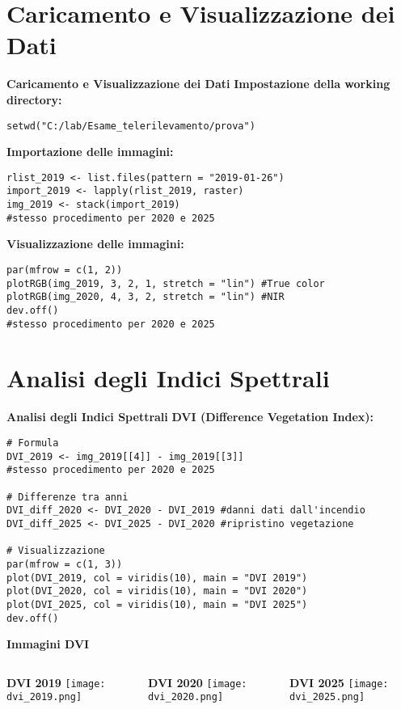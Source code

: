 \documentclass{beamer}
\begin{document}
\section{Caricamento e Visualizzazione dei Dati}

\begin{frame}[fragile]{\textbf{Caricamento e Visualizzazione dei Dati}}
\textbf{Impostazione della working directory:}
\begin{lstlisting}
setwd("C:/lab/Esame_telerilevamento/prova")
\end{lstlisting}

\textbf{Importazione delle immagini:}
\begin{lstlisting}
rlist_2019 <- list.files(pattern = "2019-01-26")
import_2019 <- lapply(rlist_2019, raster)
img_2019 <- stack(import_2019)
#stesso procedimento per 2020 e 2025
\end{lstlisting}

\textbf{Visualizzazione delle immagini:}
\begin{lstlisting}
par(mfrow = c(1, 2))
plotRGB(img_2019, 3, 2, 1, stretch = "lin") #True color
plotRGB(img_2020, 4, 3, 2, stretch = "lin") #NIR
dev.off()
#stesso procedimento per 2020 e 2025
\end{lstlisting}
\end{frame}

\section{Analisi degli Indici Spettrali}

\begin{frame}[fragile]{\textbf{Analisi degli Indici Spettrali}}
\textbf{DVI (Difference Vegetation Index):}
\begin{lstlisting}
# Formula
DVI_2019 <- img_2019[[4]] - img_2019[[3]]
#stesso procedimento per 2020 e 2025

# Differenze tra anni
DVI_diff_2020 <- DVI_2020 - DVI_2019 #danni dati dall'incendio
DVI_diff_2025 <- DVI_2025 - DVI_2020 #ripristino vegetazione

# Visualizzazione
par(mfrow = c(1, 3))
plot(DVI_2019, col = viridis(10), main = "DVI 2019")
plot(DVI_2020, col = viridis(10), main = "DVI 2020")
plot(DVI_2025, col = viridis(10), main = "DVI 2025")
dev.off()

\end{lstlisting}
\end{frame}

\begin{frame}{\textbf{Immagini DVI}}
\begin{columns}
    \centering
    \textbf{DVI 2019}
    \texttt{[image: dvi\_2019.png]}
    
    \centering
    \textbf{DVI 2020}
    \texttt{[image: dvi\_2020.png]}
    
    \centering
    \textbf{DVI 2025}
    \texttt{[image: dvi\_2025.png]}
\end{columns}
\end{frame}
\end{document}

